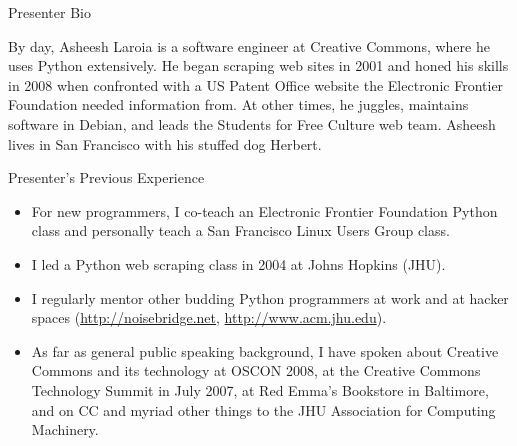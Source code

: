 \documentclass[10pt,a4paper,english]{article}
\begin{document}
Presenter Bio

By day, Asheesh Laroia is a software engineer at Creative Commons, where
he uses Python extensively. He began scraping web sites in 2001 and
honed his skills in 2008 when confronted with a US Patent Office website
the Electronic Frontier Foundation needed information from.
At other times, he juggles, maintains software in Debian, and leads the Students for Free Culture
web team. Asheesh lives in San Francisco with his stuffed dog Herbert.

Presenter's Previous Experience
\begin{itemize}
\item {} 
For new programmers, I co-teach an Electronic Frontier Foundation Python class and personally teach a San Francisco Linux Users Group class.

\item {} 
I led a Python web scraping class in 2004 at Johns Hopkins (JHU).

\item {} 
I regularly mentor other budding Python programmers at work and at hacker spaces (\href{http://noisebridge.net}{http://noisebridge.net}, \href{http://www.acm.jhu.edu}{http://www.acm.jhu.edu}).

\item {} 
As far as general public speaking background, I have spoken about Creative Commons and its technology at OSCON 2008, at the Creative Commons Technology Summit in July 2007, at Red Emma's Bookstore in Baltimore, and on CC and myriad other things to the JHU Association for Computing Machinery.

\end{itemize}
\end{document}
